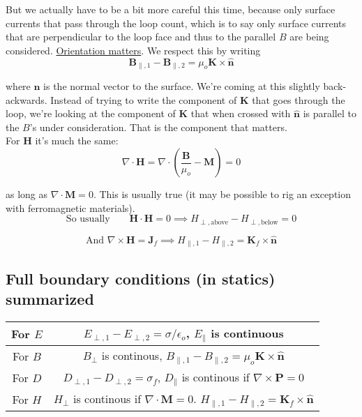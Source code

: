 \documentclass{article}
\numberwithin{equation}{section}
\newcommand{\nhat}{\mathbf{\hat{n}}}
\begin{document}
But we actually have to be a bit more careful this time, because only surface currents that pass through the loop count, which is to say only surface currents that are perpendicular to the loop face and thus to the parallel $B$ are being considered. \underline{Orientation matters}. We respect this by writing
\begin{equation*}
    \boxed{\bm{B}_{\parallel, 1} - \bm{B}_{\parallel, 2} = \mu_o \bm{K} \times \nhat}
\end{equation*}

where $\bm{n}$ is the normal vector to the surface. We're coming at this slightly back-ackwards. Instead of trying to write the component of $\bm{K}$ that goes through the loop, we're looking at the component of $\bm{K}$ that when crossed with $\nhat$ is parallel to the $B$'s under consideration. That is the component that matters. \\

For $\bm{H}$ it's much the same:
\begin{equation*}
    \nabla \cdot \bm{H} = \nabla \cdot \left( \frac{\bm{B}}{\mu_o} - \bm{M} \right) = 0
\end{equation*}

as long as $\nabla \cdot \bm{M} = 0$. This is usually true (it may be possible to rig an exception with ferromagnetic materials).
\begin{equation*}
    \text{So usually} \qquad \bm{H} \cdot \bm{H} = 0 \implies \boxed{H_{\perp, \text{above}} - H_{\perp, \text{below}} = 0}
\end{equation*}

\begin{equation*}
    \text{And } \nabla \times \bm{H} = \bm{J}_f \implies \boxed{H_{\parallel, 1} - H_{\parallel, 2} = \bm{K}_f \times \nhat}
\end{equation*}

\subsection*{Full boundary conditions (in statics) summarized}

\begin{table}[H]
\centering
{}
\begin{tabular}{@{}c|c@{}}
\toprule
For $E$ & $E_{\perp, 1} - E_{\perp, 2} = \sigma/\epsilon_o$, $E_{\parallel}$ is continuous \\ \midrule
For $B$ & $B_{\perp}$ is continous, $B_{\parallel,1} - B_{\parallel,2} = \mu_o \bm{K} \times \nhat$ \\ \midrule
For $D$ & $D_{\perp,1} - D_{\perp,2} = \sigma_f$, $D_{\parallel}$ is continous if $\nabla \times \bm{P} = 0$ \\ \midrule
For $H$ & $H_{\perp}$ is continous if $\nabla \cdot \bm{M} = 0$. $H_{\parallel, 1} - H_{\parallel,2} = \bm{K}_f \times \nhat$ \\ \bottomrule
\end{tabular}
\label{tab:static_bcs}
\end{table}
\end{document}

